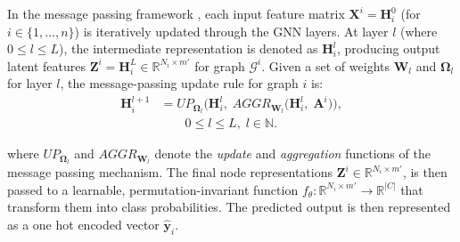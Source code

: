 In the message passing framework \cite{messagepassing}, each input feature matrix $\mathbf{X}^i = \mathbf{H}^0_i$ (for $i \in \{1, \ldots, n\}$) is iteratively updated through the GNN layers. At layer $l$ (where $0 \leq l \leq L$), the intermediate representation is denoted as $\mathbf{H}_i^l$, producing output latent features $\mathbf{Z}^i = \mathbf{H}^L_i \in \mathbb{R}^{N_i \times m'}$ for graph $\mathcal{G}^i$.
Given a set of weights $\mathbf{W}_l$ and $\mathbf{\Omega}_l$ for layer $l$, the message-passing update rule for graph $i$ is:
\begin{equation}
\begin{aligned}
\mathbf{H}^{l+1}_i
&=
UP_{\mathbf{\Omega}_l}\Big(
    \mathbf{H}^{l}_i,\;
    AGGR_{\mathbf{W}_l}\big(
        \mathbf{H}^{l}_i,\;
        \mathbf{A}^i
    \big)
\Big), \\
&\qquad 0 \leq l \leq L,\; l \in \mathbb{N}.
\end{aligned}
\end{equation}

where $UP_{\mathbf{\Omega}_l}$ and $AGGR_{\mathbf{W}_l}$ denote the \textit{update} and \textit{aggregation} functions of the message passing mechanism.
The final node representations \( \mathbf{Z}^i \in \mathbb{R}^{N_i \times m'} \), is then passed to a learnable, permutation-invariant function \( f_{\theta}: \mathbb{R}^{N_i \times m'} \rightarrow \mathbb{R}^{|C|} \) that transform them into class probabilities. The predicted output is then represented as a one hot encoded vector \( \mathbf{\hat{y}}_i \).


